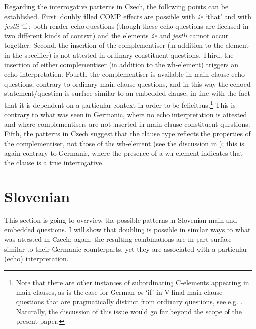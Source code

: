 \documentclass[output=paper,modfonts, hidelinks, newtxmath]{langscibook}
\begin{document}
\ea
	\z 
\z 

\noindent Regarding the interrogative patterns in Czech, the following points can be established. First, doubly filled COMP effects are possible with \textit{že} `that' and with \textit{jestli} `if': both render echo questions (though these echo questions are licensed in two different kinds of context) and the elements \textit{že} and \textit{jestli} cannot occur together. Second, the insertion of the complementiser (in addition to the element in the specifier) is not attested in ordinary constituent questions. Third, the insertion of either complementiser (in addition to the wh-element) triggers an echo interpretation. Fourth, the complementiser is available in main clause echo questions, contrary to ordinary main clause questions, and in this way the echoed statement/question is surface-similar to an embedded clause, in line with the fact that it is dependent on a particular context in order to be felicitous.\footnote{Note that there are other instances of subordinating C-elements appearing in main clauses, as is the case for German \textit{ob} `if' in V-final main clause questions that are pragmatically distinct from ordinary questions, see e.g. \citet{zimmermann2013}. Naturally, the discussion of this issue would go far beyond the scope of the present paper.} This is contrary to what was seen in Germanic, where no echo interpretation is attested and where complementisers are not inserted in main clause constituent questions. Fifth, the patterns in Czech suggest that the clause type reflects the properties of the complementiser, not those of the wh-element (see the discussion in ); this is again contrary to Germanic, where the presence of a wh-element indicates that the clause is a true interrogative.

\section{Slovenian}
This section is going to overview the possible patterns in Slovenian main and embedded questions. I will show that doubling is possible in similar ways to what was attested in Czech; again, the resulting combinations are in part surface-similar to their Germanic counterparts, yet they are associated with a particular (echo) interpretation.
\end{document}
